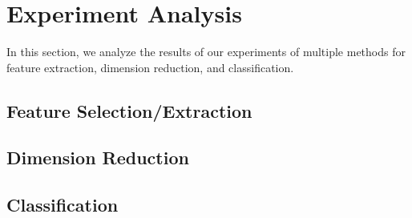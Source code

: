 \section{Experiment Analysis}
In this section, we analyze the results of our experiments of multiple methods for feature extraction, dimension reduction, and classification. 
\subsection{Feature Selection/Extraction}

\subsection{Dimension Reduction}
\subsection{Classification}
